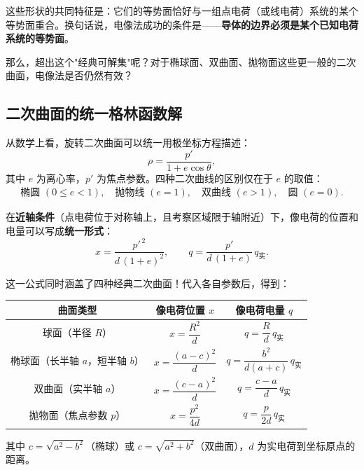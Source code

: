 这些形状的共同特征是：它们的等势面恰好与一组点电荷（或线电荷）系统的某个等势面重合。换句话说，电像法成功的条件是——\textbf{导体的边界必须是某个已知电荷系统的等势面}。

那么，超出这个"经典可解集"呢？对于椭球面、双曲面、抛物面这些更一般的二次曲面，电像法是否仍然有效？

\subsection{二次曲面的统一格林函数解}

从数学上看，旋转二次曲面可以统一用极坐标方程描述：
\[
    \rho = \frac{p'}{1 + e\cos\theta},
\]
其中 $e$ 为离心率，$p'$ 为焦点参数。四种二次曲线的区别仅在于 $e$ 的取值：
\[
    \begin{aligned}
        \text{椭圆 } (0 \le e < 1), \quad
        \text{抛物线 } (e = 1), \quad
        \text{双曲线 } (e > 1), \quad
        \text{圆 } (e = 0).
    \end{aligned}
\]

在\textbf{近轴条件}（点电荷位于对称轴上，且考察区域限于轴附近）下，像电荷的位置和电量可以写成\textbf{统一形式}：
\[
    \boxed{ x = \frac{p'^{\,2}}{d\,(1+e)^2}, \qquad
        q = \frac{p'}{d\,(1+e)}\, q_{\text{实}} }.
\]

这一公式同时涵盖了四种经典二次曲面！代入各自参数后，得到：

\begin{center}
    \begin{tabular}{c|c|c}
        \toprule
        \textbf{曲面类型}        & \textbf{像电荷位置 $x$}       & \textbf{像电荷电量 $q$}                      \\
        \midrule
        球面（半径 $R$）           & $x = \dfrac{R^2}{d}$     & $q = \dfrac{R}{d}\,q_{\text{实}}$        \\[6pt]
        椭球面（长半轴 $a$，短半轴 $b$） & $x = \dfrac{(a-c)^2}{d}$ & $q = \dfrac{b^2}{d(a+c)}\,q_{\text{实}}$ \\[6pt]
        双曲面（实半轴 $a$）         & $x = \dfrac{(c-a)^2}{d}$ & $q = \dfrac{c-a}{d}\,q_{\text{实}}$      \\[6pt]
        抛物面（焦点参数 $p$）        & $x = \dfrac{p^2}{4d}$    & $q = \dfrac{p}{2d}\,q_{\text{实}}$       \\
        \bottomrule
    \end{tabular}
\end{center}
其中 $c = \sqrt{a^2 - b^2}$（椭球）或 $c = \sqrt{a^2 + b^2}$（双曲面），$d$ 为实电荷到坐标原点的距离。


